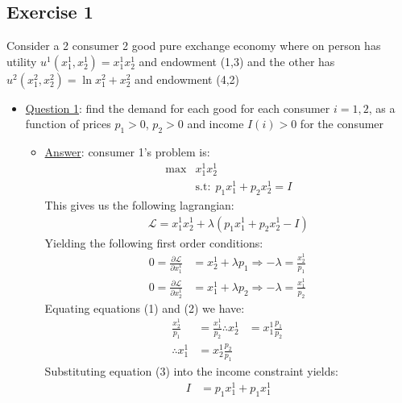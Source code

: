\documentclass{article}
\begin{document}
\subsection{Exercise 1}
Consider a 2 consumer 2 good pure exchange economy where on person has utility $u^{1}(x_{1}^{1},x_{2}^{1}) = x_{1}^{1}x_{2}^{1}$ and endowment (1,3) and the other has $u^{2}(x_{1}^{2},x_{2}^{2}) = \ln x_{1}^{2} + x_{2}^{2}$ and endowment (4,2)
  \par \vspace{0.3em}
  \begin{itemize}
    \item  \underline{Question 1}: find the demand for each good for each consumer $i= 1,2$, as a function of prices $p_{1} > 0$, $p_{2} > 0$ and income $I(i) > 0$ for the consumer
    \begin{itemize}
      \item  \underline{Answer}: consumer 1's problem is:
      \begin{align*}
        \max &x_{1}^{1}x_{2}^{1} \\
        &\text{s.t:} \ \ p_{1}x_{1}^{1} + p_{2}x_{2}^{1} = I
      \end{align*}
      This gives us the following lagrangian:
      \begin{gather*}
        \mathcal{L} = x_{1}^{1}x_{2}^{1} + \lambda(p_{1}x_{1}^{1} + p_{2}x_{2}^{1} - I)
      \end{gather*}
      Yielding the following first order conditions:
      \begin{align*}
        0 = \frac{\partial \mathcal{L}}{\partial x_{1}^{1}} &= x_{2}^{1} + \lambda p_{1} \Rightarrow - \lambda = \frac{x_{2}^{1}}{p_{1}} \ \tag{1} \\
        0 = \frac{\partial \mathcal{L}}{\partial x_{2}^{1}} &= x_{1}^{1} + \lambda p_{2} \Rightarrow - \lambda = \frac{x_{1}^{1}}{p_{2}} \ \tag{2}
      \end{align*}
      Equating equations (1) and (2) we have:
      \begin{align*}
        \frac{x_{2}^{1}}{p_{1}} &= \frac{x_{1}^{1}}{p_{2}}
        \therefore x_{2}^{1} &= x_{1}^{1} \frac{p_{1}}{p_{2}} \ \tag{3} \\
        \therefore x_{1}^{1} &= x_{2}^{1} \frac{p_{2}}{p_{1}} \ \tag{4}
      \end{align*}
      Substituting equation (3) into the income constraint yields:
      \begin{align*}
        I &= p_{1}x_{1}^{1} + p_{1}x_{1}^{1} \\

\end{align*}
\end{itemize}
\end{itemize}
\end{document}
